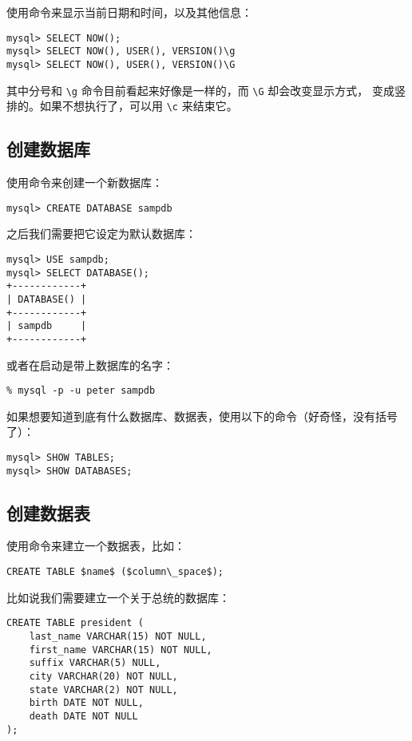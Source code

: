 使用命令来显示当前日期和时间，以及其他信息：
\begin{lstlisting}
mysql> SELECT NOW();
mysql> SELECT NOW(), USER(), VERSION()\g
mysql> SELECT NOW(), USER(), VERSION()\G
\end{lstlisting}

其中分号和 \verb|\g| 命令目前看起来好像是一样的，而 \verb|\G| 却会改变显示方式，
变成竖排的。如果不想执行了，可以用 \verb|\c| 来结束它。

\subsection{创建数据库}

使用命令来创建一个新数据库：
\begin{lstlisting}
mysql> CREATE DATABASE sampdb
\end{lstlisting}

之后我们需要把它设定为默认数据库：
\begin{lstlisting}
mysql> USE sampdb;
mysql> SELECT DATABASE();
+------------+
| DATABASE() |
+------------+
| sampdb     |
+------------+
\end{lstlisting}

或者在启动是带上数据库的名字：
\begin{lstlisting}
% mysql -p -u peter sampdb
\end{lstlisting}

如果想要知道到底有什么数据库、数据表，使用以下的命令（好奇怪，没有括号了）：
\begin{lstlisting}
mysql> SHOW TABLES;
mysql> SHOW DATABASES;
\end{lstlisting}

\subsection{创建数据表}

使用命令来建立一个数据表，比如：
\begin{lstlisting}
CREATE TABLE $name$ ($column\_space$);
\end{lstlisting}

比如说我们需要建立一个关于总统的数据库：
\begin{lstlisting}
CREATE TABLE president (
    last_name VARCHAR(15) NOT NULL,
    first_name VARCHAR(15) NOT NULL,
    suffix VARCHAR(5) NULL,
    city VARCHAR(20) NOT NULL,
    state VARCHAR(2) NOT NULL,
    birth DATE NOT NULL,
    death DATE NOT NULL
);
\end{lstlisting}

